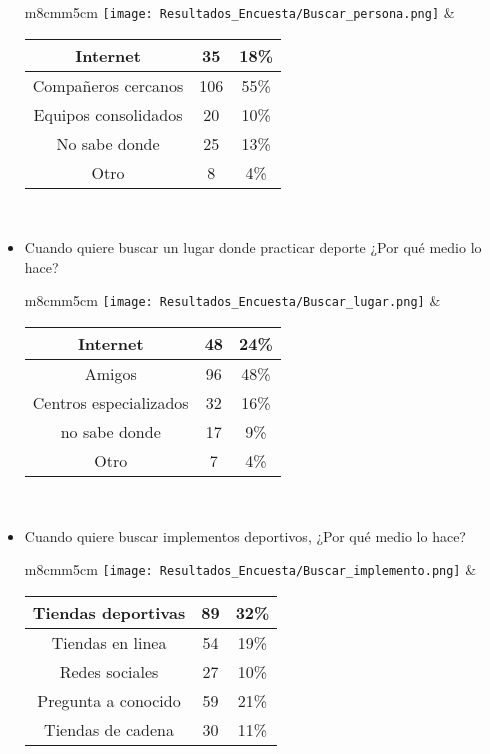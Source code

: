 \begin{itemize}
      \begin{tabular}{m{8cm}m{5cm}}
        \texttt{[image: Resultados\_Encuesta/Buscar\_persona.png]} &
        \begin{tabular}{|c|cc|}
        \hline
         Internet & 35 & 18\% \\ \hline
         Compañeros cercanos & 106 & 55\% \\ \hline
         Equipos consolidados & 20 & 10\% \\ \hline
         No sabe donde & 25 & 13\% \\ \hline
         Otro & 8 & 4\% \\ \hline
        \end{tabular} \\
      \end{tabular}
  \item Cuando quiere buscar un lugar donde practicar deporte ¿Por qué medio lo hace? \\
      \begin{tabular}{m{8cm}m{5cm}}
        \texttt{[image: Resultados\_Encuesta/Buscar\_lugar.png]} &
        \begin{tabular}{|c|cc|}
        \hline
         Internet & 48 & 24\% \\ \hline
         Amigos & 96 & 48\% \\ \hline
         Centros especializados & 32 & 16\% \\ \hline
         no sabe donde & 17 & 9\% \\ \hline
         Otro & 7 & 4\% \\ \hline
        \end{tabular} \\
      \end{tabular}
  \item Cuando quiere buscar implementos deportivos, ¿Por qué medio lo hace? \\
      \begin{tabular}{m{8cm}m{5cm}}
        \texttt{[image: Resultados\_Encuesta/Buscar\_implemento.png]} &
        \begin{tabular}{|c|cc|}
        \hline
         Tiendas deportivas & 89 & 32\% \\ \hline
         Tiendas en linea & 54 & 19\% \\ \hline
         Redes sociales & 27 & 10\% \\ \hline
         Pregunta a conocido & 59 & 21\% \\ \hline
         Tiendas de cadena & 30 & 11\% \\ \hline

\end{tabular}
\end{tabular}
\end{itemize}
